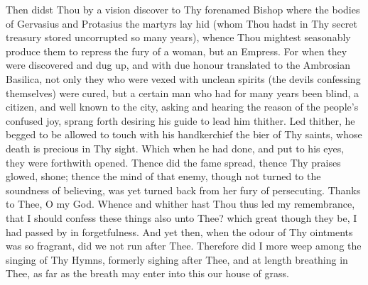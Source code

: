 \documentclass[b5paper,openright,12pt,twoside]{book}
\begin{document}
Then didst Thou by a vision discover to Thy forenamed Bishop where the
bodies of Gervasius and Protasius the martyrs lay hid (whom Thou hadst
in Thy secret treasury stored uncorrupted so many years), whence Thou
mightest seasonably produce them to repress the fury of a woman, but an
Empress. For when they were discovered and dug up, and with due honour
translated to the Ambrosian Basilica, not only they who were vexed with
unclean spirits (the devils confessing themselves) were cured, but a
certain man who had for many years been blind, a citizen, and well known
to the city, asking and hearing the reason of the people's confused joy,
sprang forth desiring his guide to lead him thither. Led thither, he
begged to be allowed to touch with his handkerchief the bier of Thy
saints, whose death is precious in Thy sight. Which when he had done,
and put to his eyes, they were forthwith opened. Thence did the fame
spread, thence Thy praises glowed, shone; thence the mind of that enemy,
though not turned to the soundness of believing, was yet turned back
from her fury of persecuting. Thanks to Thee, O my God. Whence and
whither hast Thou thus led my remembrance, that I should confess these
things also unto Thee? which great though they be, I had passed by in
forgetfulness. And yet then, when the odour of Thy ointments was so
fragrant, did we not run after Thee. Therefore did I more weep among
the singing of Thy Hymns, formerly sighing after Thee, and at length
breathing in Thee, as far as the breath may enter into this our house of
grass.
\end{document}
